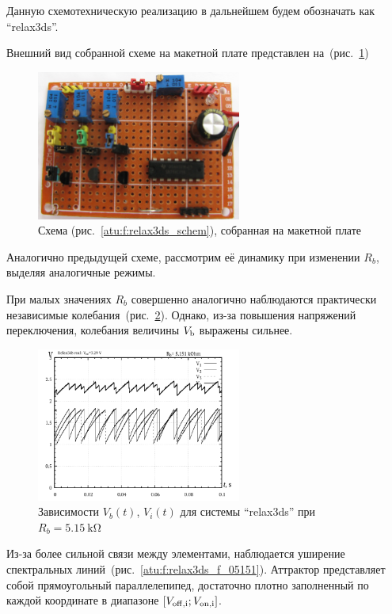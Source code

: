 Данную схемотехническую реализацию в дальнейшем будем обозначать как ``relax3ds''.

Внешний вид собранной схеме на макетной плате представлен на~(рис.~\ref{atu:f:relax3ds_board})

\begin{figure}[htb!]
  \centerline{\includegraphics[width=0.6\textwidth]{p/relax3ds_board.jpg} }
  \caption{Схема (рис.~\ref{atu:f:relax3ds_schem}), собранная на макетной плате}
  \label{atu:f:relax3ds_board}
\end{figure}

Аналогично предыдущей схеме, рассмотрим её динамику при
изменении $R_b$, выделяя аналогичные режимы.


При малых
значениях $R_b$
совершенно аналогично наблюдаются практически независимые
колебания~(рис.~\ref{atu:f:relax3ds_t_05151}).
Однако, из-за повышения напряжений переключения,
колебания величины $V_\mathrm{b}$
выражены сильнее.

\begin{figure}[htb!]
  \centerline{\includegraphics[width=0.6\textwidth]{p/relax3ds_t_005151.png} }
  \caption{Зависимости $V_b(t)$, $V_i(t)$ для системы ``relax3ds'' при $R_b=\SI{5.15}{\kilo\ohm}$ }
  \label{atu:f:relax3ds_t_05151}
\end{figure}


Из-за более сильной связи между элементами,
наблюдается уширение спектральных линий~(рис.~\ref{atu:f:relax3ds_f_05151}).
Аттрактор представляет собой прямоугольный параллелепипед, достаточно плотно заполненный по каждой координате в
диапазоне $[ V_\mathrm{off,i} ; V_\mathrm{on,i} ] $.


